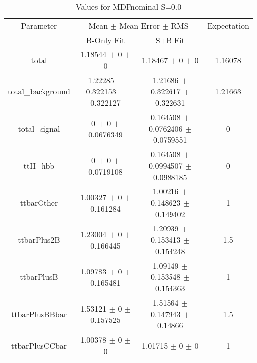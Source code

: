 \begin{table}
\centering
\caption{Values for MDFnominal S=0.0}
\begin{tabular}{cccc}
\toprule
Parameter & \multicolumn{2}{c}{Mean $\pm$ Mean Error $\pm$ RMS} & Expectation\\
 & B-Only Fit & S+B Fit & \\
\midrule
total & \num{1.18544} $\pm$ \num{0} $\pm$ \num{0} & \num{1.18467} $\pm$ \num{0} $\pm$ \num{0} & \num{1.16078}\\
total\_background & \num{1.22285} $\pm$ \num{0.322153} $\pm$ \num{0.322127} & \num{1.21686} $\pm$ \num{0.322617} $\pm$ \num{0.322631} & \num{1.21663}\\
total\_signal & \num{0} $\pm$ \num{0} $\pm$ \num{0.0676349} & \num{0.164508} $\pm$ \num{0.0762406} $\pm$ \num{0.0759551} & \num{0}\\
ttH\_hbb & \num{0} $\pm$ \num{0} $\pm$ \num{0.0719108} & \num{0.164508} $\pm$ \num{0.0994507} $\pm$ \num{0.0988185} & \num{0}\\
ttbarOther & \num{1.00327} $\pm$ \num{0} $\pm$ \num{0.161284} & \num{1.00216} $\pm$ \num{0.148623} $\pm$ \num{0.149402} & \num{1}\\
ttbarPlus2B & \num{1.23004} $\pm$ \num{0} $\pm$ \num{0.166445} & \num{1.20939} $\pm$ \num{0.153413} $\pm$ \num{0.154248} & \num{1.5}\\
ttbarPlusB & \num{1.09783} $\pm$ \num{0} $\pm$ \num{0.165481} & \num{1.09149} $\pm$ \num{0.153548} $\pm$ \num{0.154363} & \num{1}\\
ttbarPlusBBbar & \num{1.53121} $\pm$ \num{0} $\pm$ \num{0.157525} & \num{1.51564} $\pm$ \num{0.147943} $\pm$ \num{0.14866} & \num{1.5}\\
ttbarPlusCCbar & \num{1.00378} $\pm$ \num{0} $\pm$ \num{0} & \num{1.01715} $\pm$ \num{0} $\pm$ \num{0} & \num{1}\\
\bottomrule
\end{tabular}
\end{table}